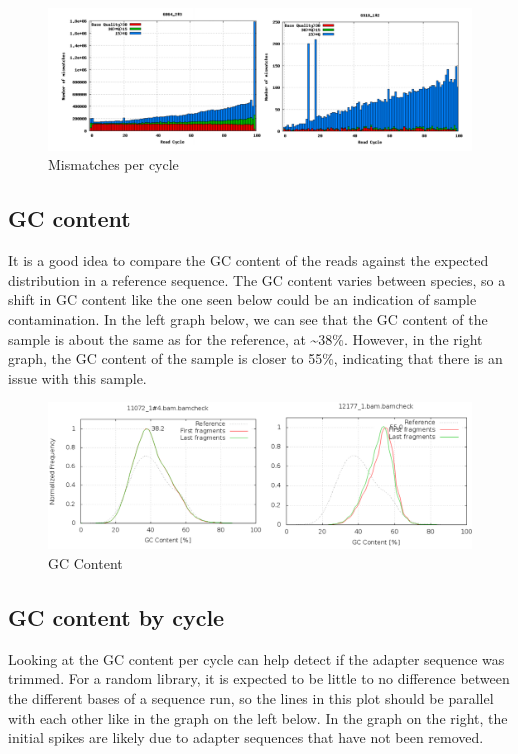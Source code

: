 \documentclass[11pt]{article}
\begin{document}
    \begin{figure}[!h]
\centering
\includegraphics{img/mismatch_per_cycle_comparison.png}
\caption{Mismatches per cycle}
\end{figure}

\pagebreak

    \hypertarget{gc-content}{%
\subsection{GC content}\label{gc-content}}

It is a good idea to compare the GC content of the reads against the
expected distribution in a reference sequence. The GC content varies
between species, so a shift in GC content like the one seen below could
be an indication of sample contamination. In the left graph below, we
can see that the GC content of the sample is about the same as for the
reference, at \textasciitilde38\%. However, in the right graph, the GC
content of the sample is closer to 55\%, indicating that there is an
issue with this sample.

    \begin{figure}[!h]
\centering
\includegraphics{img/gc_bias.png}
\caption{GC Content}
\end{figure}

    \hypertarget{gc-content-by-cycle}{%
\subsection{GC content by cycle}\label{gc-content-by-cycle}}

Looking at the GC content per cycle can help detect if the adapter
sequence was trimmed. For a random library, it is expected to be little
to no difference between the different bases of a sequence run, so the
lines in this plot should be parallel with each other like in the graph
on the left below. In the graph on the right, the initial spikes are
likely due to adapter sequences that have not been removed.
\end{document}
